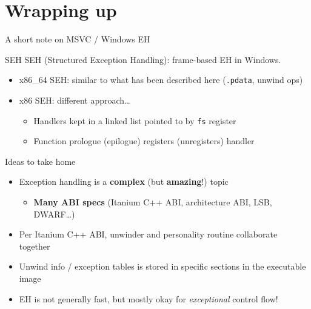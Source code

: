 \section{Wrapping up}
\begin{frame}{A short note on MSVC / Windows EH}
  \begin{block}{SEH}
    SEH (Structured Exception Handling): frame-based EH in Windows.\\[1ex]
    \begin{itemize}
    \item x86\_64 SEH: similar to what has been described here (\texttt{.pdata}, unwind ops)
      \bigskip

    \item x86 SEH: different approach\ldots{}
      \begin{itemize}
      \item Handlers kept in a linked list pointed to by \texttt{fs} register
      \item Function prologue (epilogue) registers (unregisters) handler
      \end{itemize}
    \end{itemize}
  \end{block}
\end{frame}

\begin{frame}{Ideas to take home}
  \begin{itemize}
  \item Exception handling is a \textbf{complex} (but \textbf{amazing}!) topic~{\Large\smile}
    \begin{itemize}
      \item \textbf{Many ABI specs} (Itanium C++ ABI, architecture ABI, LSB, DWARF\ldots{})
    \end{itemize}

  \item Per Itanium C++ ABI, unwinder and personality routine collaborate together~{\Large\womanDancing}
    \bigskip

  \item Unwind info / exception tables is stored in specific sections in the executable image
    \bigskip

  \item EH is not generally fast, but mostly okay for \textit{exceptional} control flow!
  \end{itemize}
\end{frame}
